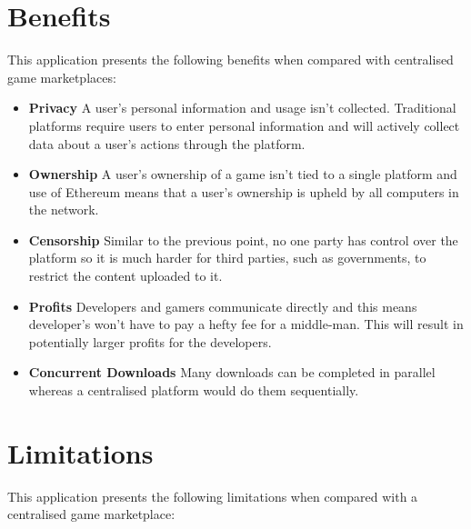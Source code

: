 
\section{Benefits}\label{des:benefits}

This application presents the following benefits when compared with centralised game marketplaces:

\begin{itemize}
  \item \textbf{Privacy} A user's personal information and usage isn't collected. Traditional platforms require users to enter personal information and will actively collect data about a user's actions through the platform.
  \item \textbf{Ownership} A user's ownership of a game isn't tied to a single platform and use of Ethereum means that a user's ownership is upheld by all computers in the network.
  \item \textbf{Censorship} Similar to the previous point, no one party has control over the platform so it is much harder for third parties, such as governments, to restrict the content uploaded to it.
  \item \textbf{Profits} Developers and gamers communicate directly and this means developer's won't have to pay a hefty fee for a middle-man. This will result in potentially larger profits for the developers.  
  \item \textbf{Concurrent Downloads} Many downloads can be completed in parallel whereas a centralised platform would do them sequentially.
\end{itemize}

\section{Limitations}\label{sec:design-lim}

This application presents the following limitations when compared with a centralised game marketplace:


